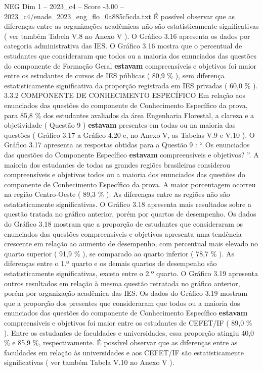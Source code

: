 \begin{textsample}{NEG Dim 1 – 2023\_c4 – Score -3.00 – 2023\_c4/enade\_2023\_eng\_flo\_0a885c5cda.txt}
É possível observar que as diferenças entre as organizações acadêmicas não são estatisticamente significativas ( ver também Tabela V.8 no Anexo V ).
O Gráfico 3.16 apresenta os dados por categoria administrativa das IES.
O Gráfico 3.16 mostra que o percentual de estudantes que consideraram que todos ou a maioria dos enunciados das questões do componente de Formação Geral \textbf{estavam} compreensíveis e objetivos foi maior entre os estudantes de cursos de IES públicas ( 80,9 \% ), sem diferença estatisticamente significativa da proporção registrada em IES privadas ( 60,0 \% ). 3.3.2 COMPONENTE DE CONHECIMENTO ESPECÍFICO Em relação aos enunciados das questões do componente de Conhecimento Específico da prova, para 85,8 \% dos estudantes avaliados da área Engenharia Florestal, a clareza e a objetividade ( Questão 9 ) \textbf{estavam} presentes em todas ou na maioria das questões ( Gráfico 3.17 a Gráfico 4.20 e, no Anexo V, as Tabelas V.9 e V.10 ).
O Gráfico 3.17 apresenta as respostas obtidas para a Questão 9 : “ Os enunciados das questões do Componente Específico \textbf{estavam} compreensíveis e objetivos? ”.
A maioria dos estudantes de todas as grandes regiões brasileiras considerou compreensíveis e objetivos todos ou a maioria dos enunciados das questões do componente de Conhecimento Específico da prova.
A maior porcentagem ocorreu na região Centro-Oeste ( 89,3 \% ).
As diferenças entre as regiões não são estatisticamente significativas.
O Gráfico 3.18 apresenta mais resultados sobre a questão tratada no gráfico anterior, porém por quartos de desempenho.
Os dados do Gráfico 3.18 mostram que a proporção de estudantes que consideraram os enunciados das questões compreensíveis e objetivos apresenta uma tendência crescente em relação ao aumento de desempenho, com percentual mais elevado no quarto superior ( 91,9 \% ), se comparado ao quarto inferior ( 78,7 \% ).
As diferenças entre o 1.º quarto e os demais quartos de desempenho são estatisticamente significativas, exceto entre o 2.º quarto.
O Gráfico 3.19 apresenta outros resultados em relação à mesma questão retratada no gráfico anterior, porém por organização acadêmica das IES.
Os dados do Gráfico 3.19 mostram que a proporção dos presentes que consideraram que todos ou a maioria dos enunciados das questões do componente de Conhecimento Específico \textbf{estavam} compreensíveis e objetivos foi maior entre os estudantes de CEFET/IF ( 89,0 \% ).
Entre os estudantes de faculdades e universidades, essa proporção atingiu 40,0 \% e 85,9 \%, respectivamente.
É possível observar que as diferenças entre as faculdades em relação às universidades e aos CEFET/IF são estatisticamente significativas ( ver também Tabela V.10 no Anexo V ).

\end{textsample}
